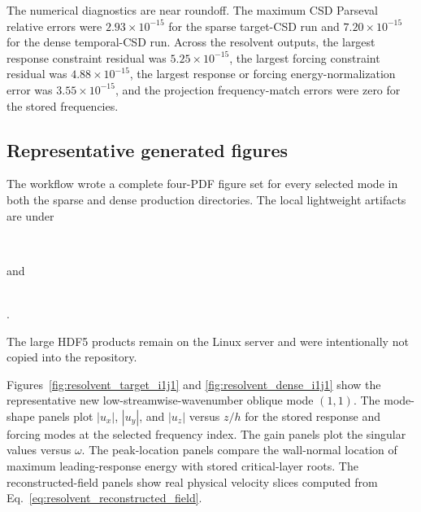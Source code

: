 \documentclass[11pt]{article}
\begin{document}
The numerical diagnostics are near roundoff. The maximum CSD Parseval relative
errors were \(2.93\times10^{-15}\) for the sparse target-CSD run and
\(7.20\times10^{-15}\) for the dense temporal-CSD run. Across the resolvent
outputs, the largest response constraint residual was
\(5.25\times10^{-15}\), the largest forcing constraint residual was
\(4.88\times10^{-15}\), the largest response or forcing
energy-normalization error was \(3.55\times10^{-15}\), and the projection
frequency-match errors were zero for the stored frequencies.

\subsection{Representative generated figures}

The workflow wrote a complete four-PDF figure set for every selected mode in
both the sparse and dense production directories. The local lightweight
artifacts are under
\begin{center}
  \\
\end{center}
and
\begin{center}
  \\
  .
\end{center}
The large HDF5 products remain on the Linux server and were intentionally not
copied into the repository.

Figures~\ref{fig:resolvent_target_i1j1} and
\ref{fig:resolvent_dense_i1j1} show the representative new
low-streamwise-wavenumber oblique mode \((1,1)\).
The mode-shape panels plot \(|u_x|\), \(|u_y|\), and \(|u_z|\) versus \(z/h\)
for the stored response and forcing modes at the selected frequency index.
The gain panels plot the singular values versus \(\omega\). The peak-location
panels compare the wall-normal location of maximum leading-response energy
with stored critical-layer roots. The reconstructed-field panels show real
physical velocity slices computed from
Eq.~\eqref{eq:resolvent_reconstructed_field}.
\end{document}

